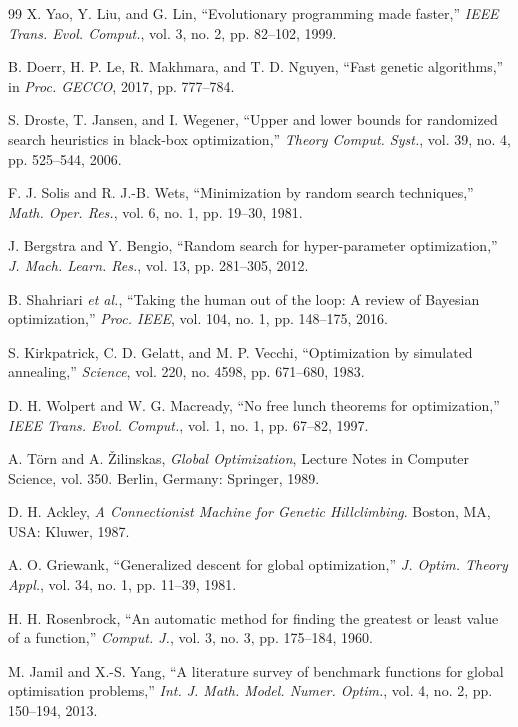\documentclass[conference]{IEEEtran}
\begin{document}
\begin{thebibliography}{99}
X. Yao, Y. Liu, and G. Lin, ``Evolutionary programming made faster,'' \emph{IEEE Trans. Evol. Comput.}, vol. 3, no. 2, pp. 82--102, 1999.

B. Doerr, H. P. Le, R. Makhmara, and T. D. Nguyen, ``Fast genetic algorithms,'' in \emph{Proc. GECCO}, 2017, pp. 777--784.

S. Droste, T. Jansen, and I. Wegener, ``Upper and lower bounds for randomized search heuristics in black-box optimization,'' \emph{Theory Comput. Syst.}, vol. 39, no. 4, pp. 525--544, 2006.

F. J. Solis and R. J.-B. Wets, ``Minimization by random search techniques,'' \emph{Math. Oper. Res.}, vol. 6, no. 1, pp. 19--30, 1981.

J. Bergstra and Y. Bengio, ``Random search for hyper-parameter optimization,'' \emph{J. Mach. Learn. Res.}, vol. 13, pp. 281--305, 2012.

B. Shahriari \emph{et al.}, ``Taking the human out of the loop: A review of Bayesian optimization,'' \emph{Proc. IEEE}, vol. 104, no. 1, pp. 148--175, 2016.

S. Kirkpatrick, C. D. Gelatt, and M. P. Vecchi, ``Optimization by simulated annealing,'' \emph{Science}, vol. 220, no. 4598, pp. 671--680, 1983.

D. H. Wolpert and W. G. Macready, ``No free lunch theorems for optimization,'' \emph{IEEE Trans. Evol. Comput.}, vol. 1, no. 1, pp. 67--82, 1997.

A. T\"{o}rn and A. \v{Z}ilinskas, \emph{Global Optimization}, Lecture Notes in Computer Science, vol. 350. Berlin, Germany: Springer, 1989.

D. H. Ackley, \emph{A Connectionist Machine for Genetic Hillclimbing}. Boston, MA, USA: Kluwer, 1987.

A. O. Griewank, ``Generalized descent for global optimization,'' \emph{J. Optim. Theory Appl.}, vol. 34, no. 1, pp. 11--39, 1981.

H. H. Rosenbrock, ``An automatic method for finding the greatest or least value of a function,'' \emph{Comput. J.}, vol. 3, no. 3, pp. 175--184, 1960.

M. Jamil and X.-S. Yang, ``A literature survey of benchmark functions for global optimisation problems,'' \emph{Int. J. Math. Model. Numer. Optim.}, vol. 4, no. 2, pp. 150--194, 2013.


\end{thebibliography}
\end{document}
